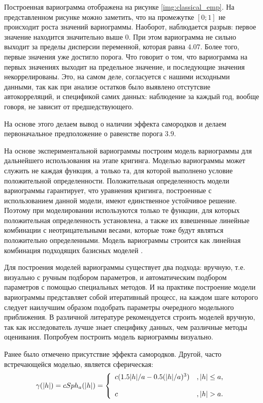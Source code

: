 Построенная вариограмма отображена на рисунке \ref{img:classical_emp}. На представленном рисунке можно заметить, что на промежутке $[0;1]$ не происходит роста значений вариограммы. Наоборот, наблюдается разрыв: первое значение находится значительно выше $0$. При этом вариограмма не сильно выходит за пределы дисперсии переменной, которая равна $4.07$. Более того, первые значения уже достигло порога. Что говорит о том, что вариограмма на первых значениях выходит на предельное значение, и последующие значения некоррелированы. Это, на самом деле, согласуется с нашими исходными данными, так как при анализе остатков было выявлено отстутсвие автокорреляций, и спецификой самих данных: наблюдение за каждый год, вообще говоря, не зависит от предшедствующего.

На основе этого делаем вывод о наличии эффекта самородков и делаем первоначальное предположение о равенстве порога $3.9$.

На основе экспериментальной вариограммы построим модель вариограммы для дальнейшего использования на этапе кригинга. Моделью вариограммы может служить не каждая функция, а только та, для которой выполнено условие положительной определенности. Положительная определенность модели вариограммы гарантирует, что уравнения кригинга, построенные с использованием данной модели, имеют единственное устойчивое решение. Поэтому при моделировании используются только те функции, для которых положительная определенность установлена, а также их взвешенные линейные комбинации с неотрицательными весами, которые тоже будут являться положительно определенными. Модель вариограммы строится как линейная комбинация подходящих базисных моделей \cite{saveliev2012}.

Для построения моделей вариограммы существует два подхода: вручную, т.е. визуально с ручным подбором параметров, и автоматическим подбором параметров с помощью специальных методов. И на практике построение модели вариограммы представляет собой итеративный процесс, на каждом шаге которого следует наилучшим образом подобрать параметры очередного модельного приближения. В различной литературе рекомендуется строить моделей вручную, так как исследователь лучше знает специфику данных, чем различные методы оценивания. Попробуем построить модель вариограммы визуально.

Ранее было отмечено присутствие эффекта самородков. Другой, часто встречающейся моделью, является сферическая:
\begin{equation}
	\gamma(\vert h \vert) = c Sph_a(\vert h \vert) = \left\{
 \begin{array}{l l}
   c(1.5 \vert h \vert / a - 0.5(\vert h \vert / a)^3) &, \vert h \vert \le a, \\
   \\
   c &,	 \vert h \vert > a.
 \end{array} \right.
\end{equation}

